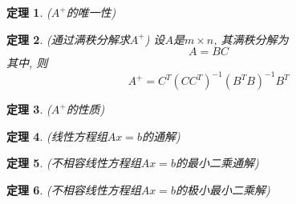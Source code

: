 \documentclass[twoside]{article}
\newtheorem{theorem}{定理}[section]
\begin{document}
\begin{theorem}
($A^+$的唯一性)
\end{theorem}

\begin{theorem}
(通过满秩分解求$A^+$)
设$A$是$m\times n$, 其满秩分解为
\begin{equation*}
    A=BC
\end{equation*}
其中, 则
\begin{equation*}
    A^+ = C^T (CC^T)^{-1} (B^TB)^{-1} B^T
\end{equation*}
\end{theorem}

\begin{theorem}
($A^+$的性质)
\end{theorem}

\begin{theorem}
(线性方程组$Ax=b$的通解)
\end{theorem}

\begin{theorem}
(不相容线性方程组$Ax=b$的最小二乘通解)
\end{theorem}

\begin{theorem}
(不相容线性方程组$Ax=b$的极小最小二乘解)
\end{theorem}
\end{document}
